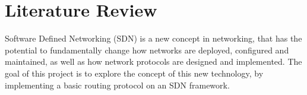 \chapter{Literature Review}

Software Defined Networking (SDN) is a new concept in networking, that has the potential to fundamentally change how networks are deployed, configured and maintained, as well as how network protocols are designed and implemented. The goal of this project is to explore the concept of this new technology, by implementing a basic routing protocol on an SDN framework.
